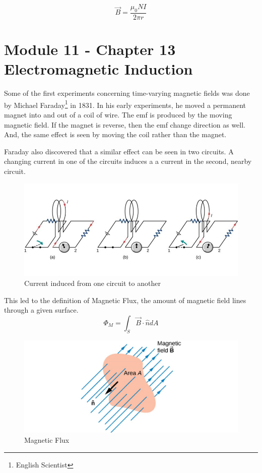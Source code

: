 \documentclass[14pt]{memoir}
\begin{document}
\begin{equation}
\vec{B} = \frac{\mu_0 N I}{2 \pi r}
\end{equation}

\chapter{Module 11 - Chapter 13 Electromagnetic Induction}
Some of the first experiments concerning time-varying magnetic fields was done by Michael Faraday\footnote{English Scientist} in 1831. In his early experiments, he moved a permanent magnet into and out of a coil of wire. The emf is produced by the moving magnetic field. If the magnet is reverse, then the emf change direction as well. And, the same effect is seen by moving the coil rather than the magnet. 

Faraday also discovered that a similar effect can be seen in two circuits. A changing current in one of the circuits induces a a current in the second, nearby circuit. 

\begin{figure}[H]
\begin{center}
\includegraphics[scale=0.5]{fig/fig_13_03.jpg}
\caption{Current induced from one circuit to another}
\label{fig:13_03}
\end{center}
\end{figure}

This led to the definition of Magnetic Flux, the amount of magnetic field lines through a given surface. 
\begin{equation}
\Phi_M = \int_S \vec{B} \cdot \hat{n} dA
\end{equation}

\begin{figure}[H]
\begin{center}
\includegraphics[scale=0.5]{fig/fig_13_04.jpg}
\caption{Magnetic Flux}
\label{fig:13_04}
\end{center}
\end{figure}
\end{document}
